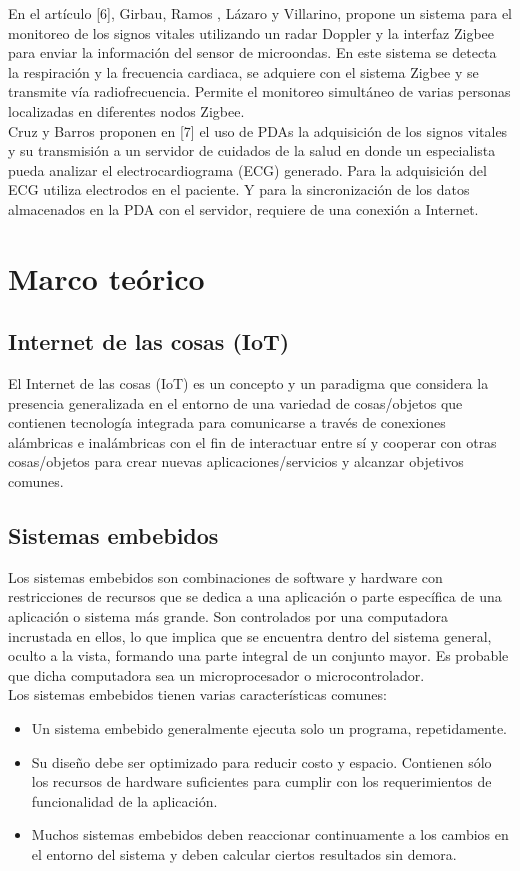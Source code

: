 	En el artículo [6], Girbau, Ramos , Lázaro y Villarino, propone un sistema para el monitoreo de los signos vitales utilizando un radar Doppler y la interfaz Zigbee para enviar la información del sensor de microondas. En este sistema se detecta la respiración y la frecuencia cardiaca, se adquiere con el sistema Zigbee y se transmite vía radiofrecuencia. Permite el monitoreo simultáneo de varias personas localizadas en diferentes nodos Zigbee. \\
	
	Cruz y Barros proponen en [7] el uso de PDAs la adquisición de los signos vitales y su transmisión a un servidor de cuidados de la salud en donde un especialista pueda analizar el electrocardiograma (ECG) generado. Para la adquisición del ECG utiliza electrodos en el paciente. Y para la sincronización de los datos almacenados en la PDA con el servidor, requiere de una conexión a Internet.
	
\section{Marco teórico}
	\subsection{Internet de las cosas (IoT)}
	El Internet de las cosas (IoT) es un concepto y un paradigma que considera la presencia generalizada en el entorno de una variedad de cosas/objetos que contienen tecnología integrada para comunicarse a través de conexiones alámbricas e inalámbricas con el fin de interactuar entre sí y cooperar con otras cosas/objetos para crear nuevas aplicaciones/servicios y alcanzar objetivos comunes.
	
	\subsection{Sistemas embebidos}
	Los sistemas embebidos son combinaciones de software y hardware con restricciones de recursos que se dedica a una aplicación o parte específica de una aplicación o sistema más grande. Son controlados por una computadora incrustada en ellos, lo que implica que se encuentra dentro del sistema general, oculto a la vista, formando una parte integral de un conjunto mayor. Es probable que dicha computadora sea un microprocesador o microcontrolador.\\
	
	Los sistemas embebidos tienen varias características comunes:
	\begin{itemize}
		\item Un sistema embebido generalmente ejecuta solo un programa, repetidamente.
		\item Su diseño debe ser optimizado para reducir costo y espacio. Contienen sólo los recursos de hardware suficientes para cumplir con  los  requerimientos  de  funcionalidad  de  la  aplicación.
		\item Muchos sistemas embebidos deben reaccionar continuamente a los cambios en el entorno del sistema y deben calcular ciertos resultados sin demora.
	\end{itemize}

